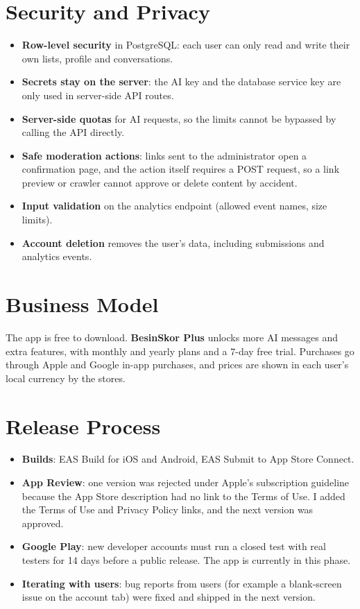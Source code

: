 \documentclass[a4paper,11pt]{article}
\begin{document}
\section{Security and Privacy}

\begin{itemize}
  \item \textbf{Row-level security} in PostgreSQL: each user can only read and write their own lists, profile and conversations.
  \item \textbf{Secrets stay on the server}: the AI key and the database service key are only used in server-side API routes.
  \item \textbf{Server-side quotas} for AI requests, so the limits cannot be bypassed by calling the API directly.
  \item \textbf{Safe moderation actions}: links sent to the administrator open a confirmation page, and the action itself requires a POST request, so a link preview or crawler cannot approve or delete content by accident.
  \item \textbf{Input validation} on the analytics endpoint (allowed event names, size limits).
  \item \textbf{Account deletion} removes the user's data, including submissions and analytics events.
\end{itemize}

\section{Business Model}

The app is free to download. \textbf{BesinSkor Plus} unlocks more AI messages and extra features, with monthly and yearly plans and a 7-day free trial. Purchases go through Apple and Google in-app purchases, and prices are shown in each user's local currency by the stores.

\section{Release Process}

\begin{itemize}
  \item \textbf{Builds}: EAS Build for iOS and Android, EAS Submit to App Store Connect.
  \item \textbf{App Review}: one version was rejected under Apple's subscription guideline because the App Store description had no link to the Terms of Use. I added the Terms of Use and Privacy Policy links, and the next version was approved.
  \item \textbf{Google Play}: new developer accounts must run a closed test with real testers for 14 days before a public release. The app is currently in this phase.
  \item \textbf{Iterating with users}: bug reports from users (for example a blank-screen issue on the account tab) were fixed and shipped in the next version.
\end{itemize}
\end{document}
